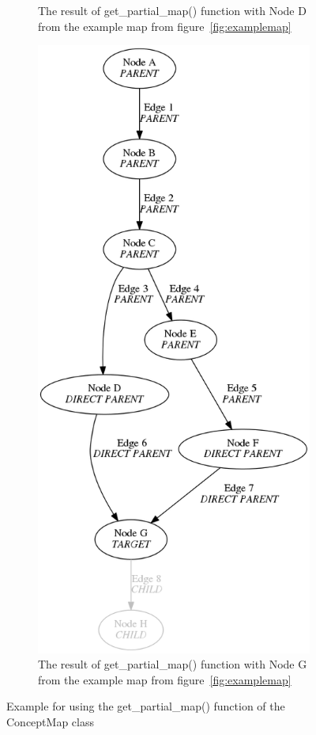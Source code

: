 \begin{figure}
\begin{subfigure}{0.4\textwidth}
        \caption{The result of get\_partial\_map() function with Node D from the example map from figure~\protect\ref{fig:examplemap}}
        \label{fig:examplemap_partial_d}
    \end{subfigure}
    \qquad
    \begin{subfigure}{0.4\textwidth}
        \centering
        \includegraphics[height=.6\textheight]{img/examplemap_partial_g.png}
        \caption{The result of get\_partial\_map() function with Node G from the example map from figure~\protect\ref{fig:examplemap}}
        \label{fig:examplemap_partial_g}
    \end{subfigure}
    \caption{Example for using the get\_partial\_map() function of the ConceptMap class}
    \label{fig:examplemap_partial}
\end{figure}

